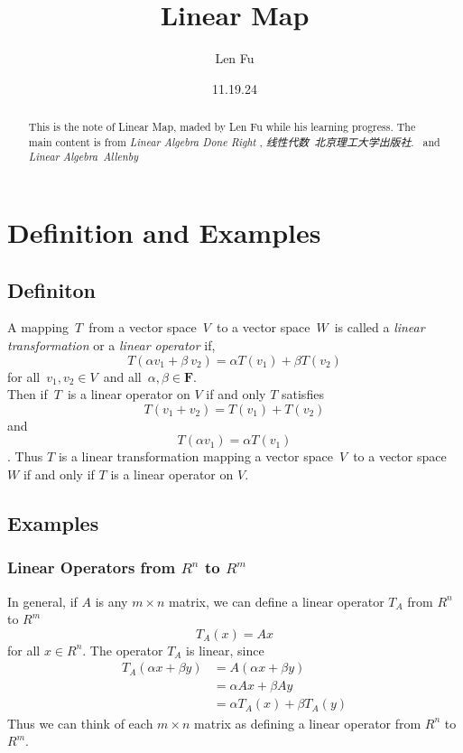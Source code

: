 \documentclass[12pt]{article} %
\title{Linear Map}
\author{Len Fu}
\date{11.19.24}
\begin{document}
\maketitle

\begin{abstract}
This is the note of Linear Map, maded by Len Fu while his learning progress. 
The main content is from \textit{Linear Algebra Done Right} , \textit{线性代数\ 北京理工大学出版社}.
\ and \textit{Linear Algebra\  Allenby}
\end{abstract}

\tableofcontents
\newpage

\section{Definition and Examples} %
\subsection{Definiton}
A mapping\ $T$\ from a vector space\ $V$\ to a vector space\ $W$\ is called 
a \textit{linear transformation} or a \textit{linear operator} if,
$$T(\alpha v_{1}+\beta\ v_{2})=\alpha T(v_{1})+\beta T(v_{2})$$
for all\ $v_{1},v_{2}\in V$\ and all\ $\alpha,\beta\in\mathbf{F}$.\\
Then if\ $T$\ is a linear operator on $V$ if and only $T$ satisfies
$$T(v_{1}+v_{2})=T(v_{1})+T(v_{2})$$
and 
$$T(\alpha v_{1})=\alpha T(v_{1})$$.
Thus $T$ is a linear transformation mapping a vector space\ $V$\ to a vector space\ $W$ 
if and only if $T$ is a linear operator on $V$.\\

\subsection{Examples} %


\subsubsection{Linear Operators from $R^{n}$ to $R^{m}$} 
In general, if $A$ is any $m\times n$ matrix, we can define a linear operator $T_{A}$ 
from $R^{n}$ to $R^{m}$ $$T_{A}(x)=Ax$$ for all $x\in R^{n}$. The operator $T_{A}$ is linear, 
since
\begin{align}
T_{A}(\alpha x+\beta y)&=A(\alpha x+\beta y)\\
&=\alpha Ax+\beta Ay\\
&=\alpha T_{A}(x)+\beta T_{A}(y)
\end{align}
Thus we can think of each $m\times n$ matrix as defining a linear operator from $R^{n}$ to $R^{m}$.
\end{document}
